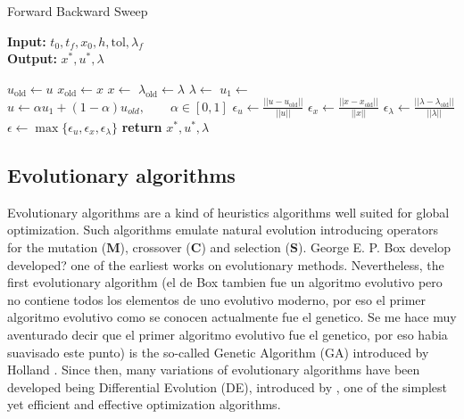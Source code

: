 \begin{algorithm}
  \caption{Forward Backward Sweep } \label{alg:forward_backward_sweep}
  \begin{flushleft}
    \hspace*{\algorithmicindent} \textbf{Input:} 
    $t_0, t_f, x_0,h, \text{tol}, \lambda_{f}$ \\
    \hspace*{\algorithmicindent} \textbf{Output:} 
    $x^*, u^*, \lambda$
  \end{flushleft}
  \begin{algorithmic}
      \State $u_{\text{old}} \gets u$ 
      \State $x_{\text{old}} \gets x$ 
      \State $ x \gets$
      \State $\lambda_{\text{old}} \gets \lambda $
      \State $\lambda \gets$ 
      \State $u_1 \gets$ 
      \State 
        $u \gets \alpha u_1 + (1-\alpha)u_{old}, 
        \qquad \alpha \in [0, 1]$
      \State 
      $\epsilon_u \gets \displaystyle 
        \frac{||u - u_{\text{old}}||}{||u||}$
      \State 
      $\epsilon_x \gets \displaystyle 
        \frac{||x - x_{\text{old}}||}{||x||}$
      \State 
        $\epsilon_{\lambda} \gets \displaystyle 
        \frac{||\lambda - \lambda_{\text{old}}||}{||\lambda||}$
      \State 
        $\epsilon \gets 
        \max{ 
          \{ \epsilon_u, \epsilon_x, \epsilon_{\lambda} \}
       }$
    \EndWhile\label{}
      \State \textbf{return} $ x^*, u^*, \lambda$
    \EndProcedure
  \end{algorithmic}
\end{algorithm}
\medskip  
\subsection{Evolutionary algorithms}
Evolutionary algorithms are a kind of heuristics algorithms well suited for 
global optimization. Such algorithms emulate natural evolution introducing 
operators for the mutation ($\mathbf{M}$), crossover ($\mathbf{C}$) and 
selection ($\mathbf{S}$). George E. P. Box \cite{Box1957}
develop {\color{red} developed?} one of the earliest works on evolutionary methods. Nevertheless,  the 
first evolutionary algorithm {\color{red} (el de Box tambien fue un algoritmo evolutivo pero no contiene todos los elementos de uno evolutivo moderno, por eso el primer algoritmo evolutivo como se conocen actualmente fue el genetico. Se me hace muy aventurado decir que el primer algoritmo evolutivo fue el genetico, por eso habia suavisado este punto)} is the so-called Genetic Algorithm (GA) introduced 
by Holland \citet{JHH1975}. Since then, many variations of
evolutionary algorithms have been developed being Differential Evolution (DE),
introduced by \citet{Storn1997}, one of the simplest yet 
efficient and effective optimization algorithms. 

